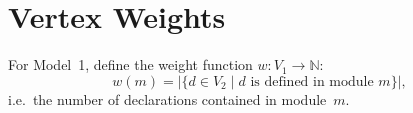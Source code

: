 \section{Vertex Weights}

For Model~1, define the weight function $w \colon V_1 \to \mathbb{N}$:
\[
  w(m) = |\{d \in V_2 \mid d \text{ is defined in module } m\}|,
\]
i.e.\ the number of declarations contained in module~$m$.
